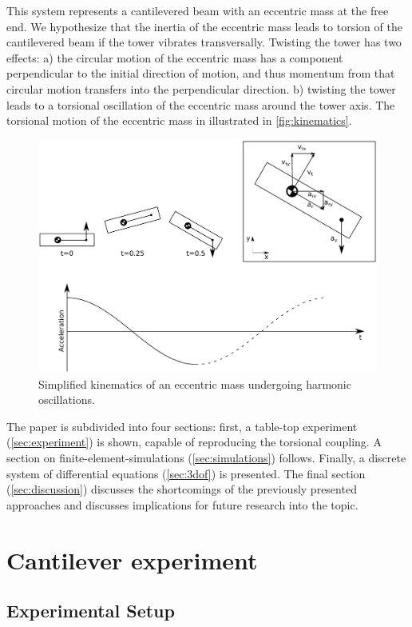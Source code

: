 \documentclass{article}
\begin{document}
This system represents a cantilevered beam with an eccentric mass at the free end. We hypothesize that the inertia of the eccentric mass leads to torsion of the cantilevered beam if the tower vibrates transversally. Twisting the tower has two effects: a) the circular motion of the eccentric mass has a component perpendicular to the initial direction of motion, and thus momentum from that circular motion transfers into the perpendicular direction. b) twisting the tower leads to a torsional oscillation of the eccentric mass around the tower axis. The torsional motion of the eccentric mass in illustrated in \autoref{fig:kinematics}.

\begin{figure}[ht!]
    \centering
    \includegraphics[width=0.7\linewidth]{manuscript/figures/kinematics.pdf}
    \caption{Simplified kinematics of an eccentric mass undergoing harmonic oscillations.}
    \label{fig:kinematics}
\end{figure}

The paper is subdivided into four sections: first, a table-top experiment (\autoref{sec:experiment}) is shown, capable of reproducing the torsional coupling. A section on finite-element-simulations (\autoref{sec:simulations}) follows. Finally, a discrete system of differential equations (\autoref{sec:3dof}) is presented. The final section (\autoref{sec:discussion}) discusses the shortcomings of the previously presented approaches and discusses implications for future research into the topic. 

\clearpage

\section{Cantilever experiment}
\label{sec:experiment}

\subsection{Experimental Setup}
\end{document}
